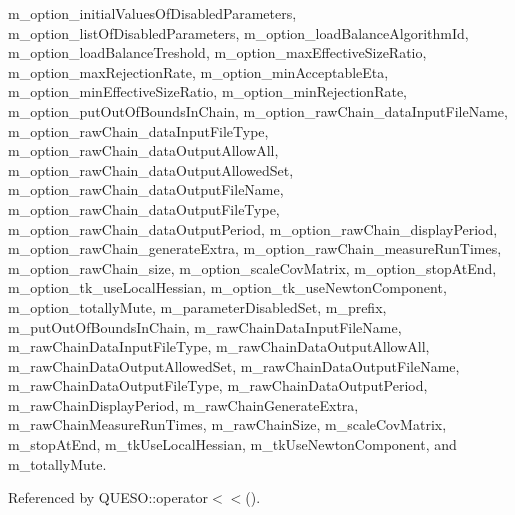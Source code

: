 m\-\_\-option\-\_\-initial\-Values\-Of\-Disabled\-Parameters, m\-\_\-option\-\_\-list\-Of\-Disabled\-Parameters, m\-\_\-option\-\_\-load\-Balance\-Algorithm\-Id, m\-\_\-option\-\_\-load\-Balance\-Treshold, m\-\_\-option\-\_\-max\-Effective\-Size\-Ratio, m\-\_\-option\-\_\-max\-Rejection\-Rate, m\-\_\-option\-\_\-min\-Acceptable\-Eta, m\-\_\-option\-\_\-min\-Effective\-Size\-Ratio, m\-\_\-option\-\_\-min\-Rejection\-Rate, m\-\_\-option\-\_\-put\-Out\-Of\-Bounds\-In\-Chain, m\-\_\-option\-\_\-raw\-Chain\-\_\-data\-Input\-File\-Name, m\-\_\-option\-\_\-raw\-Chain\-\_\-data\-Input\-File\-Type, m\-\_\-option\-\_\-raw\-Chain\-\_\-data\-Output\-Allow\-All, m\-\_\-option\-\_\-raw\-Chain\-\_\-data\-Output\-Allowed\-Set, m\-\_\-option\-\_\-raw\-Chain\-\_\-data\-Output\-File\-Name, m\-\_\-option\-\_\-raw\-Chain\-\_\-data\-Output\-File\-Type, m\-\_\-option\-\_\-raw\-Chain\-\_\-data\-Output\-Period, m\-\_\-option\-\_\-raw\-Chain\-\_\-display\-Period, m\-\_\-option\-\_\-raw\-Chain\-\_\-generate\-Extra, m\-\_\-option\-\_\-raw\-Chain\-\_\-measure\-Run\-Times, m\-\_\-option\-\_\-raw\-Chain\-\_\-size, m\-\_\-option\-\_\-scale\-Cov\-Matrix, m\-\_\-option\-\_\-stop\-At\-End, m\-\_\-option\-\_\-tk\-\_\-use\-Local\-Hessian, m\-\_\-option\-\_\-tk\-\_\-use\-Newton\-Component, m\-\_\-option\-\_\-totally\-Mute, m\-\_\-parameter\-Disabled\-Set, m\-\_\-prefix, m\-\_\-put\-Out\-Of\-Bounds\-In\-Chain, m\-\_\-raw\-Chain\-Data\-Input\-File\-Name, m\-\_\-raw\-Chain\-Data\-Input\-File\-Type, m\-\_\-raw\-Chain\-Data\-Output\-Allow\-All, m\-\_\-raw\-Chain\-Data\-Output\-Allowed\-Set, m\-\_\-raw\-Chain\-Data\-Output\-File\-Name, m\-\_\-raw\-Chain\-Data\-Output\-File\-Type, m\-\_\-raw\-Chain\-Data\-Output\-Period, m\-\_\-raw\-Chain\-Display\-Period, m\-\_\-raw\-Chain\-Generate\-Extra, m\-\_\-raw\-Chain\-Measure\-Run\-Times, m\-\_\-raw\-Chain\-Size, m\-\_\-scale\-Cov\-Matrix, m\-\_\-stop\-At\-End, m\-\_\-tk\-Use\-Local\-Hessian, m\-\_\-tk\-Use\-Newton\-Component, and m\-\_\-totally\-Mute.



Referenced by Q\-U\-E\-S\-O\-::operator$<$$<$().


